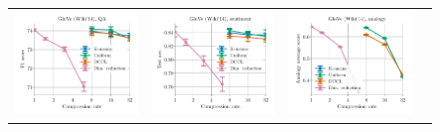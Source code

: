 \begin{figure}
	\centering
	\begin{tabular}{@{\hskip -0.0in}c@{\hskip -0.0in}c@{\hskip -0.0in}c@{\hskip -0.0in}c@{\hskip -0.0in}}
		\includegraphics[width=.245\linewidth]{figures/glove400k_qa_best-f1_vs_compression_linx_det.pdf} &
		\includegraphics[width=.245\linewidth]{figures/glove400k_sentiment_sst_test-acc_vs_compression_linx_det.pdf} &
		\includegraphics[width=.245\linewidth]{figures/glove400k_intrinsics_analogy-avg-score_vs_compression_linx_det.pdf} &

\end{tabular}
\end{figure}
